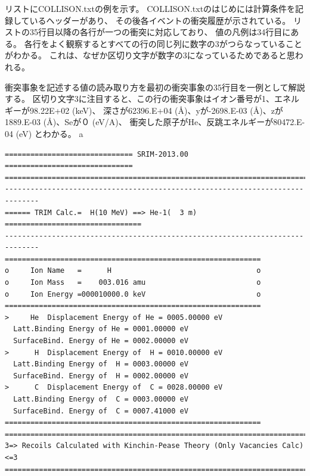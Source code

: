 \documentclass [11pt,a4paper,dvipdfmx] {jarticle}
\begin{document}
リストにCOLLISON.txtの例を示す。
COLLISON.txtのはじめには計算条件を記録しているヘッダーがあり、
その後各イベントの衝突履歴が示されている。
リストの35行目以降の各行が一つの衝突に対応しており、
値の凡例は34行目にある。
各行をよく観察するとすべての行の同じ列に数字の3がつらなっていることがわかる。
これは、なぜか区切り文字が数字の3になっているためであると思われる。

衝突事象を記述する値の読み取り方を最初の衝突事象の35行目を一例として解説する。
区切り文字3に注目すると、この行の衝突事象はイオン番号が1、エネルギーが98.22E+02 (keV)、
深さが62396.E+04 (\AA)、yが-2698.E-03 (\AA)、zが1889.E-03 (\AA)、Seが０ (eV/A)、
衝突した原子がHe、反跳エネルギーが80472.E-04 (eV) とわかる。
a


\begin{lstlisting}[caption={COLLISION.txtの例。1イベントのみ抽出。},basicstyle=\fontsize{6}{6}\ttfamily,identifierstyle=\fontsize{6}{6},numberstyle={\tiny},columns=fixed]
============================== SRIM-2013.00 ==============================
==============================================================================
------------------------------------------------------------------------------
====== TRIM Calc.=  H(10 MeV) ==> He-1(  3 m) ================================
------------------------------------------------------------------------------
============================================================
o     Ion Name   =      H                                  o
o     Ion Mass   =    003.016 amu                          o
o     Ion Energy =000010000.0 keV                          o
============================================================
>     He  Displacement Energy of He = 0005.00000 eV
  Latt.Binding Energy of He = 0001.00000 eV
  SurfaceBind. Energy of He = 0002.00000 eV
>      H  Displacement Energy of  H = 0010.00000 eV
  Latt.Binding Energy of  H = 0003.00000 eV
  SurfaceBind. Energy of  H = 0002.00000 eV
>      C  Displacement Energy of  C = 0028.00000 eV
  Latt.Binding Energy of  C = 0003.00000 eV
  SurfaceBind. Energy of  C = 0007.41000 eV
============================================================
==========================================================================
3=> Recoils Calculated with Kinchin-Pease Theory (Only Vacancies Calc) <=3
==========================================================================
 

\end{lstlisting}
\end{document}
